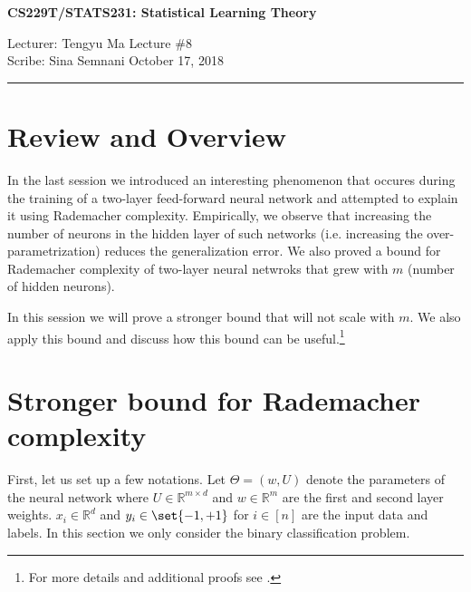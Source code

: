 \documentclass[11pt]{article}
\newcommand{\draftnotice}{\vbox to 0.25in{\noindent
   \raisebox{0.6in}[0in][0in]{\makebox[\textwidth][r]{\it
    DRAFT --- a final version will be posted shortly}}}
   \vspace{-.25in}\vspace{-\baselineskip}
}
\newcommand{\IR}{\mathbb{R}}
\DeclarePairedDelimiter\set\{\}
\begin{document}
\thispagestyle{empty}


\begin{center}
	\bf\large CS229T/STATS231: Statistical Learning Theory
\end{center}

\noindent
Lecturer: Tengyu Ma   %
\hfill
Lecture \#8               %
\\
Scribe: Sina Semnani                  %
\hfill
October 17, 2018           %

\noindent
\rule{\textwidth}{1pt}

\medskip




\section{Review and Overview}
In the last session we introduced an interesting phenomenon that occures during
the training of a two-layer
feed-forward neural network and attempted to explain it using Rademacher complexity.
Empirically, we observe that increasing the number
of neurons in the hidden layer of such networks (i.e. increasing the over-parametrization)
reduces the generalization error. We also proved a bound for Rademacher complexity of two-layer
neural netwroks that grew with $m$ (number of hidden neurons).

In this session we will prove a stronger bound that will not scale with $m$.
We also apply this bound and discuss how this bound can be useful.\footnote{For more details and additional
	proofs see \cite{Wei2018}.}

\section{Stronger bound for Rademacher complexity}
First, let us set up a few notations.
Let $\Theta=\left(w, U\right)$ denote the parameters of the neural network where
$U \in \IR^{m\times d}$ and $w \in \IR^{m}$ are the first and second layer weights.
$x_i \in \IR^d$ and $y_i \in \set{-1,+1}$ for $i \in \left[n\right]$ are the
input data and labels. In this section we only consider the binary classification problem.
\end{document}
